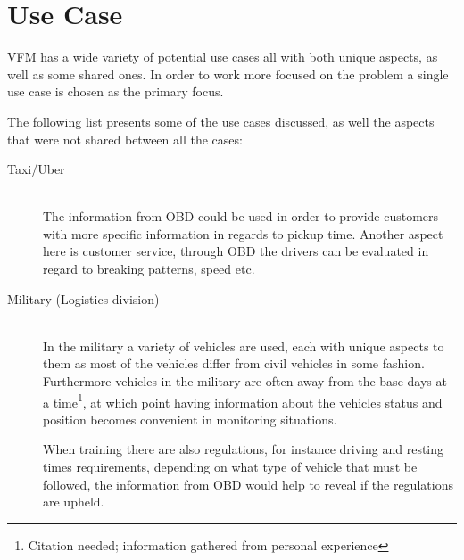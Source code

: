 \section{Use Case}
\acl{VFM} has a wide variety of potential use cases all with both unique aspects, as well as some shared ones.
In order to work more focused on the problem a single use case is chosen as the primary focus.

The following list presents some of the use cases discussed, as well the aspects that were not shared between all the cases:

\begin{description}
    \item [Taxi/Uber] \hfill \\
    The information from \ac{OBD} could be used in order to provide customers with more specific information in regards to pickup time.
    Another aspect here is customer service, through \ac{OBD} the drivers can be evaluated in regard to breaking patterns, speed etc.
    \item [Military (Logistics division)] \hfill \\
    In the military a variety of vehicles are used, each with unique aspects to them as most of the vehicles differ from civil vehicles in some fashion.
    Furthermore vehicles in the military are often away from the base days at a time\footnote{Citation needed; information gathered from personal experience}, at which point having information about the vehicles status and position becomes convenient in monitoring situations.

    When training there are also regulations, for instance driving and resting times requirements, depending on what type of vehicle that must be followed, the information from \ac{OBD} would help to reveal if the regulations are upheld.


\end{description}
